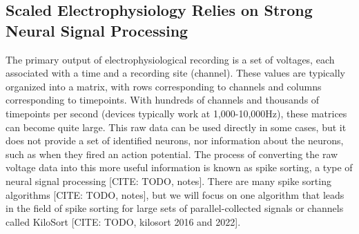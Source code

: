 \documentclass[11pt]{article}
\newcommand{\subsectionwithindent}[1]{
    \subsection*{#1}
    \hspace{\parindent} %
}
\begin{document}






\subsectionwithindent{Scaled Electrophysiology Relies on Strong Neural Signal Processing} %
The primary output of electrophysiological recording is a set of voltages, each associated with a time and a recording site (channel). These values are typically organized into a matrix, with rows corresponding to channels and columns corresponding to timepoints. With hundreds of channels and thousands of timepoints per second (devices typically work at 1,000-10,000Hz), these matrices can become quite large. This raw data can be used directly in some cases, but it does not provide a set of identified neurons, nor information about the neurons, such as when they fired an action potential. The process of converting the raw voltage data into this more useful information is known as spike sorting, a type of neural signal processing [CITE: TODO, notes]. There are many spike sorting algorithms [CITE: TODO, notes], but we will focus on one algorithm that leads in the field of spike sorting for large sets of parallel-collected signals or channels called KiloSort [CITE: TODO, kilosort 2016 and 2022].
\end{document}

